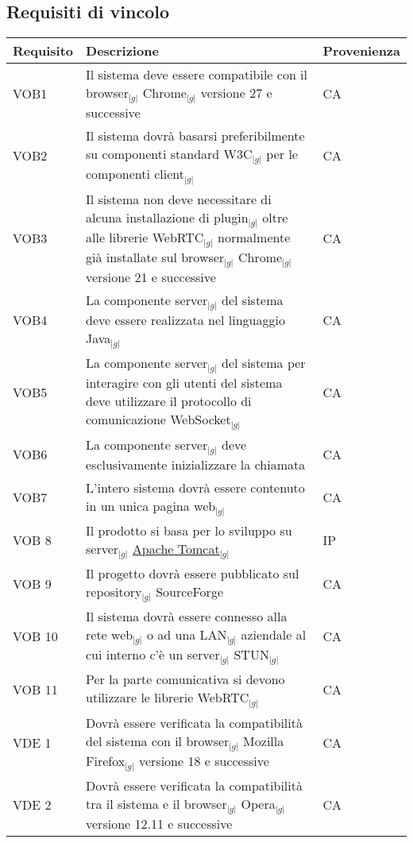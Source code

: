 \subsection{Requisiti di vincolo}
\begin{longtable}{p{} p{} p{} }
\rowcolors{2}{light}{}
\textbf{Requisito} & \textbf{Descrizione} & \textbf{Provenienza} \\
\midrule
\midrule
VOB1 & Il sistema deve essere compatibile con il browser$_{|g|}$ Chrome$_{|g|}$ versione 27 e successive & CA\\
\midrule
VOB2 & Il sistema dovrà basarsi preferibilmente su componenti standard W3C$_{|g|}$ per le componenti client$_{|g|}$ & CA\\
\midrule
VOB3 & Il sistema non deve necessitare di alcuna installazione di plugin$_{|g|}$ oltre alle librerie WebRTC$_{|g|}$ normalmente già installate sul browser$_{|g|}$ Chrome$_{|g|}$ versione 21 e successive & CA\\
\midrule
VOB4 & La componente server$_{|g|}$ del sistema deve essere realizzata nel linguaggio Java$_{|g|}$ & CA\\
\midrule
VOB5 & La componente server$_{|g|}$ del sistema per interagire con gli utenti del sistema deve utilizzare il protocollo di comunicazione WebSocket$_{|g|}$ & CA\\
\midrule
VOB6 & La componente server$_{|g|}$ deve esclusivamente inizializzare la chiamata & CA\\
\midrule
VOB7 & L'intero sistema dovrà essere contenuto in un unica pagina web$_{|g|}$ & CA\\
\midrule
VOB 8 & Il prodotto si basa per lo sviluppo su server$_{|g|}$ \underline{Apache Tomcat}$_{|g|}$ & IP\\
\midrule
VOB 9 & Il progetto dovrà essere pubblicato sul repository$_{|g|}$ SourceForge & CA\\
\midrule
VOB 10 & Il sistema dovrà essere connesso alla rete web$_{|g|}$ o ad una LAN$_{|g|}$ aziendale al cui interno c'è un server$_{|g|}$ STUN$_{|g|}$ & CA\\
\midrule
VOB 11 & Per la parte comunicativa si devono utilizzare le librerie WebRTC$_{|g|}$ & CA\\

\midrule
VDE 1 & Dovrà essere verificata la compatibilità del sistema con il browser$_{|g|}$ Mozilla Firefox$_{|g|}$ versione 18 e successive & CA\\
\midrule
VDE 2 & Dovrà essere verificata la compatibilità tra il sistema e il browser$_{|g|}$ Opera$_{|g|}$ versione 12.11 e successive & CA\\


\end{longtable}
